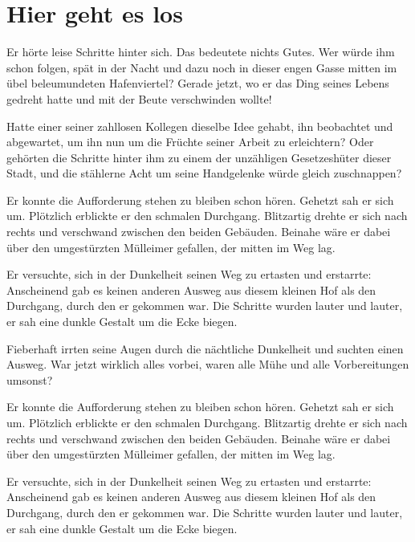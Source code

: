 \documentclass[12pt,ngerman,a4paper,DIV=11]{scrartcl}
\makeatletter
\newif \if@mainmatter \@mainmattertrue
\newcommand*\mainmatter{\clearpage\thispagestyle{plain}\@mainmattertrue\pagenumbering{arabic}}
\makeatother
\begin{document}
{
\hypersetup{linkcolor=black}
\setcounter{tocdepth}{3}
\thispagestyle{plain}
\tableofcontents
}
\listoftables
\listoffigures

\mainmatter
\section{Hier geht es los}\label{hier-geht-es-los}

Er hörte leise Schritte hinter sich. Das bedeutete nichts Gutes. Wer
würde ihm schon folgen, spät in der Nacht und dazu noch in dieser engen
Gasse mitten im übel beleumundeten Hafenviertel? Gerade jetzt, wo er das
Ding seines Lebens gedreht hatte und mit der Beute verschwinden wollte!

Hatte einer seiner zahllosen Kollegen dieselbe Idee gehabt, ihn
beobachtet und abgewartet, um ihn nun um die Früchte seiner Arbeit zu
erleichtern? Oder gehörten die Schritte hinter ihm zu einem der
unzähligen Gesetzeshüter dieser Stadt, und die stählerne Acht um seine
Handgelenke würde gleich zuschnappen?

Er konnte die Aufforderung stehen zu bleiben schon hören. Gehetzt sah er
sich um. Plötzlich erblickte er den schmalen Durchgang. Blitzartig
drehte er sich nach rechts und verschwand zwischen den beiden Gebäuden.
Beinahe wäre er dabei über den umgestürzten Mülleimer gefallen, der
mitten im Weg lag.

Er versuchte, sich in der Dunkelheit seinen Weg zu ertasten und
erstarrte: Anscheinend gab es keinen anderen Ausweg aus diesem kleinen
Hof als den Durchgang, durch den er gekommen war. Die Schritte wurden
lauter und lauter, er sah eine dunkle Gestalt um die Ecke biegen.

Fieberhaft irrten seine Augen durch die nächtliche Dunkelheit und
suchten einen Ausweg. War jetzt wirklich alles vorbei, waren alle Mühe
und alle Vorbereitungen umsonst?

Er konnte die Aufforderung stehen zu bleiben schon hören. Gehetzt sah er
sich um. Plötzlich erblickte er den schmalen Durchgang. Blitzartig
drehte er sich nach rechts und verschwand zwischen den beiden Gebäuden.
Beinahe wäre er dabei über den umgestürzten Mülleimer gefallen, der
mitten im Weg lag.

Er versuchte, sich in der Dunkelheit seinen Weg zu ertasten und
erstarrte: Anscheinend gab es keinen anderen Ausweg aus diesem kleinen
Hof als den Durchgang, durch den er gekommen war. Die Schritte wurden
lauter und lauter, er sah eine dunkle Gestalt um die Ecke biegen.
\end{document}
